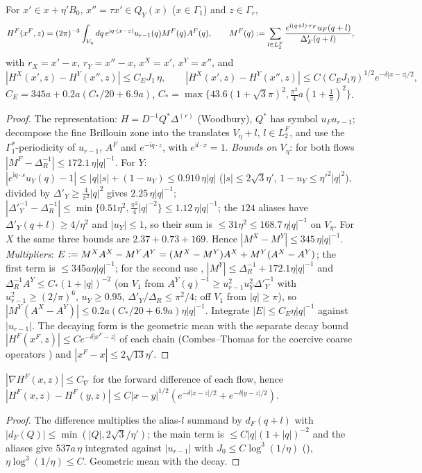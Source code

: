 \begin{lemma}\label{rot:lem:H}
For $x'\in x+\eta'B_0$, $x''=\tau x'\in Q_Y(x)$ ($x\in\Gamma_1$) and $z\in\Gamma_r$,
\[
H^F(x^F,z)=(2\pi)^{-3}\int_{V_\eta}dq\,e^{\mathrm iq\cdot(x-z)}u_{r-1}(q)M^F(q)A^F(q),\qquad M^F(q):=\sum_{l\in L^F_2}\frac{e^{\mathrm i(q+l)\cdot r_F}u_F(q+l)}{\Delta'_F(q+l)},
\]
with $r_X=x'-x$, $r_Y=x''-x$, $x^X=x'$, $x^Y=x''$, and
\[
|H^X(x',z)-H^Y(x'',z)|\le C_EJ_1\,\eta,\qquad |H^X(x',z)-H^Y(x'',z)|\le C(C_EJ_1\eta)^{1/2}e^{-\delta|x-z|/2},
\]
$C_E=345a+0.2a(C_*/20+6.9a)$, $C_*=\max\{43.6(1+\sqrt3\pi)^2,\frac{\pi^2}4a(1+\frac1\pi)^2\}$.
\end{lemma}
\begin{proof}
The representation: $H=D^{-1}Q^*\Delta^{(r)}$ (Woodbury), $Q^*$ has symbol $u_Fu_{r-1}$; decompose the fine Brillouin zone into the translates $V_\eta+l$, $l\in L^F_2$, and use the $\Gamma_1^*$-periodicity of $u_{r-1}$, $A^F$ and $e^{-\mathrm iq\cdot z}$, with $e^{\mathrm il\cdot x}=1$. \emph{Bounds on $V_\eta$}: for both flows $|M^F-\Delta_R^{-1}|\le172.1\,\eta|q|^{-1}$. For $Y$: $|e^{\mathrm iq\cdot s}u_Y(q)-1|\le|q||s|+(1-u_Y)\le0.910\,\eta|q|$ ($|s|\le2\sqrt3\eta'$, $1-u_Y\le\eta'^2|q|^2$), divided by $\Delta'_Y\ge\frac4{\pi^2}|q|^2$ gives $2.25\,\eta|q|^{-1}$; $|\Delta'^{-1}_Y-\Delta_R^{-1}|\le\min\{0.51\eta^2,\frac{\pi^2}4|q|^{-2}\}\le1.12\,\eta|q|^{-1}$; the $124$ aliases have $\Delta'_Y(q+l)\ge4/\eta^2$ and $|u_Y|\le1$, so their sum is $\le31\eta^2\le168.7\,\eta|q|^{-1}$ on $V_\eta$. For $X$ the same three bounds are $2.37+0.73+169$. Hence $|M^X-M^Y|\le345\,\eta|q|^{-1}$. \emph{Multipliers}: $E:= M^XA^X-M^YA^Y=(M^X-M^Y)A^X+M^Y(A^X-A^Y)$; the first term is $\le345a\eta|q|^{-1}$; for the second use , $|M^Y|\le\Delta_R^{-1}+172.1\eta|q|^{-1}$ and $\Delta_R^{-1}A^Y\le C_*(1+|q|)^{-2}$ (on $V_1$ from $A^Y(q)^{-1}\ge u_{r-1}^2u_Y^2\Delta'^{-1}_Y$ with $u_{r-1}^2\ge(2/\pi)^6$, $u_Y\ge0.95$, $\Delta'_Y/\Delta_R\le\pi^2/4$; off $V_1$ from $|q|\ge\pi$), so $|M^Y(A^X-A^Y)|\le0.2a(C_*/20+6.9a)\eta|q|^{-1}$. Integrate $|E|\le C_E\eta|q|^{-1}$ against $|u_{r-1}|$. The decaying form is the geometric mean with the separate decay bound $|H^F(x^F,z)|\le Ce^{-\delta|x^F-z|}$ of each chain (Combes--Thomas for the coercive coarse operators \cite{CT73}) and $|x^F-x|\le2\sqrt{13}\eta'$.
\end{proof}

\begin{lemma}[gradients and H\"older bounds at $A=0$]\label{rot:lem:grad}
$|\nabla H^F(x,z)|\le C_\nabla$ for the forward difference of each flow, hence $|H^F(x,z)-H^F(y,z)|\le C|x-y|^{1/2}(e^{-\delta|x-z|/2}+e^{-\delta|y-z|/2})$.
\end{lemma}
\begin{proof}
The difference multiplies the alias-$l$ summand by $d_F(q+l)$ with $|d_F(Q)|\le\min(|Q|,2\sqrt3/\eta')$; the main term is $\le C|q|(1+|q|)^{-2}$ and the aliases give $537a\,\eta$ integrated against $|u_{r-1}|$ with $J_0\le C\log^3(1/\eta)$ (), $\eta\log^3(1/\eta)\le C$. Geometric mean with the decay.
\end{proof}

